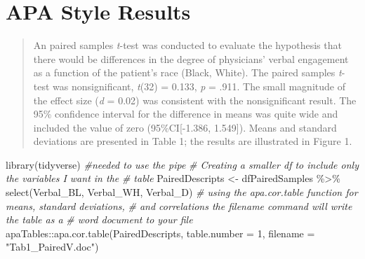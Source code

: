 \documentclass[
  11pt,
]{book}
\newenvironment{Shaded}{\begin{snugshade}}{\end{snugshade}}
\newcommand{\AttributeTok}[1]{\textcolor[rgb]{0.77,0.63,0.00}{#1}}
\newcommand{\CommentTok}[1]{\textcolor[rgb]{0.56,0.35,0.01}{\textit{#1}}}
\newcommand{\DecValTok}[1]{\textcolor[rgb]{0.00,0.00,0.81}{#1}}
\newcommand{\FunctionTok}[1]{\textcolor[rgb]{0.00,0.00,0.00}{#1}}
\newcommand{\NormalTok}[1]{#1}
\newcommand{\OtherTok}[1]{\textcolor[rgb]{0.56,0.35,0.01}{#1}}
\newcommand{\SpecialCharTok}[1]{\textcolor[rgb]{0.00,0.00,0.00}{#1}}
\newcommand{\StringTok}[1]{\textcolor[rgb]{0.31,0.60,0.02}{#1}}
\begin{document}
\hypertarget{apa-style-results-2}{%
\section{APA Style Results}\label{apa-style-results-2}}

\begin{quote}
An paired samples \emph{t}-test was conducted to evaluate the hypothesis that there would be differences in the degree of physicians' verbal engagement as a function of the patient's race (Black, White). The paired samples \emph{t}-test was nonsignificant, \emph{t}(32) = 0.133, \emph{p} = .911. The small magnitude of the effect size (\emph{d} = 0.02) was consistent with the nonsignificant result. The 95\% confidence interval for the difference in means was quite wide and included the value of zero (95\%CI{[}-1.386, 1.549{]}). Means and standard deviations are presented in Table 1; the results are illustrated in Figure 1.
\end{quote}

\begin{Shaded}
\begin{Highlighting}[]
\FunctionTok{library}\NormalTok{(tidyverse)  }\CommentTok{\#needed to use the pipe }
\CommentTok{\# Creating a smaller df to include only the variables I want in the}
\CommentTok{\# table}
\NormalTok{PairedDescripts }\OtherTok{\textless{}{-}}\NormalTok{ dfPairedSamples }\SpecialCharTok{\%\textgreater{}\%}
    \FunctionTok{select}\NormalTok{(Verbal\_BL, Verbal\_WH, Verbal\_D)}
\CommentTok{\# using the apa.cor.table function for means, standard deviations,}
\CommentTok{\# and correlations the filename command will write the table as a}
\CommentTok{\# word document to your file}
\NormalTok{apaTables}\SpecialCharTok{::}\FunctionTok{apa.cor.table}\NormalTok{(PairedDescripts, }\AttributeTok{table.number =} \DecValTok{1}\NormalTok{, }\AttributeTok{filename =} \StringTok{"Tab1\_PairedV.doc"}\NormalTok{)}
\end{Highlighting}
\end{Shaded}
\end{document}
